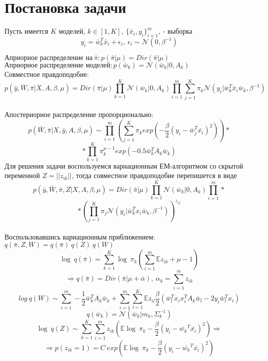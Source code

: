 \documentclass[12pt,twoside]{article}
\begin{document}
\section{Постановка задачи}
Пусть имеется $K$ моделей, $k \in [1,K],~\{\bar{x}_i,y_i\}_{i=1}^m,~\text{- выборка}$
$$y_i = \bar{w}_k^T\bar{x}_i+\epsilon_i,~ \epsilon_i \sim \mathcal{N}(0,\beta^{-1})$$

$\text{Априорное распределение на}~ \bar{\pi}: p(\bar{\pi} |\mu) = Dir(\bar{\pi}|\mu)$\\
$\text{Априорное распределение моделей}: p(\bar{w}_k) = \mathcal{N}(\bar{w}_k|0,A_k)$\\
Совместное правдоподобие:
$$p(\bar{y},\bar{W},\bar{\pi}|X,A,\beta,\mu)=Dir(\bar{\pi}|\mu)\prod\limits_{k=1}^K \mathcal{N}(\bar{w}_k|0,A_k)\prod\limits_{i=1}^m  \sum\limits_{j=1}^K\pi_k \mathcal{N}(y_i|\bar{w}_k^T \bar x_i\bar{w}_k,\beta^{-1})$$\\
Апостериорное распределение пропорционально:
$$p(\bar{W},\bar{\pi}|X,\bar y,A,\beta,\mu)\sim \prod\limits_{i=1}^m\left(\sum\limits_{j=1}^K \pi_k exp\left(-\frac{\beta}{2}(y_i - \bar{w}_j^T\bar{x_i})^2\right)\right)*$$
$$*\prod\limits_{k=1}^K\pi_k^{\mu-1}exp(-0.5\bar{w}_k^TA_k\bar{w}_k)$$
Для решения задачи воспользуемся вариационным ЕМ-алгоритмом со скрытой переменной $Z = ||z_{ik}||$, тогда совместное правдоподобие перепишется в виде
$$p(\bar{y},\bar{W},\bar{\pi},Z|X,A,\beta,\mu)=Dir(\bar{\pi}|\mu)\prod\limits_{k=1}^K \mathcal{N}(\bar{w}_k|0,A_k)\prod\limits_{i=1}^m *$$
$$*\left( \prod\limits_{j=1}^K\pi_j \mathcal{N}(y_i|\bar{w}_k^T x_i\bar{w}_k,\beta^{-1})\right)^{z_{ij}}$$\\
Воспользовавшись вариационным приближением: ~$ q(\bar{\pi},Z,W) = q(\bar{\pi})~q(Z)~q(W)$\\

$$\log~q(\bar{\pi}) = \sum\limits_{k=1}^K \log~\pi_k\left( \sum\limits_{i=1}^m\mathbb{E}z_{ik}+\mu-1\right)$$
$$ \Rightarrow q(\bar{\pi}) = Dir(\bar{\pi}|\mu + \bar{\alpha}),~ \alpha_k=\sum\limits_{i=1}^m z_{ik}$$
$$log~q(W) \sim \sum\limits_{i=1}^m-\frac{1}{2}\bar{w}_k^TA_k\bar{w}_k + \sum\limits_{i=1}^m \sum\limits_{l=1}^K \mathbb{E}z_{il}\frac{\beta}{2}\left(\bar{w}_l^Tx_ix_i^TA_k\bar{w}_l - 2y_i\bar{w}_l^Tx_i\right)$$
$$q(\bar{w}_k) = \mathcal{N}(\bar{w}_k|m_k, \Sigma_k^{-1})$$
$$\log~q(Z) \sim \sum \limits_{k=1}^{K} \sum \limits_{i=1}^{m} z_{ik} \left(\mathbb{E} \log~\pi_k - \frac{\beta}{2}(y_i-\bar{w_k}^T \bar{x_i})^2 \right) \Rightarrow$$
$$\Rightarrow p(z_{ik} = 1) = C~exp \left(\mathbb{E} \log~\pi_k -  \frac{\beta}{2}(y_i-\bar{w_k}^T \bar{x_i})^2 \right)$$
\end{document}
